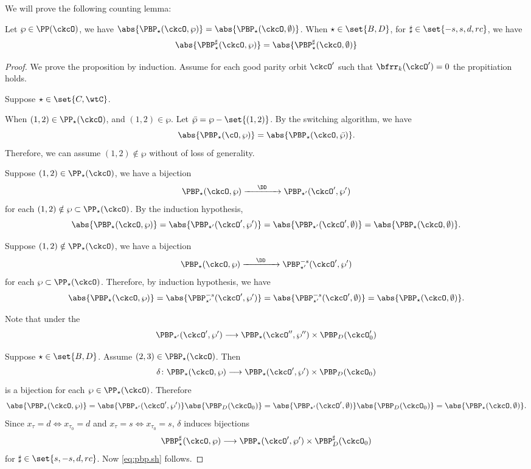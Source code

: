 \documentclass[unipcounting]{subfiles}
\begin{document}
We will prove the following counting lemma:

\begin{prop}
Let $\wp\in \PP(\ckcO)$, we have $\abs{\PBP_\star(\ckcO,\wp)} = \abs{\PBP_\star(\ckcO,\emptyset)}$. 
When $\star  \in \set{B,D}$, 
for $\sharp \in \set{ -s, s, d, rc}$,
we have  
\begin{equation}\label{eq:pbp.sh}
\abs{\PBP_\star^\sharp(\ckcO, \wp)}=\abs{\PBP_\star^\sharp(\ckcO, \emptyset)}
\end{equation}
\end{prop}
\begin{proof}
We prove the proposition by induction. 
Assume for each good parity orbit $\ckcO'$ such that $\bfrr_k(\ckcO')=0$ the propitiation holds.   

Suppose $\star\in \set{C,\wtC}$.

When $(1,2)\in \PP_\star(\ckcO)$, and $(1,2)\in \wp$.  
Let $\bar\wp = \wp  - \set{(1,2)}$.  
By the switching algorithm, we have 
\[
\abs{\PBP_\star(\cO,\wp)} = \abs{\PBP_\star(\ckcO,\bar\wp)}.
\]
Therefore, we can assume $(1,2)\notin \wp$ without of loss of generality. 

Suppose $(1,2)\in \PP_\star(\ckcO)$, we have a bijection
\[
\PBP_\star(\ckcO,\wp)\xrightarrow{\ \ \ \ \DD\ \ \ \ }\PBP_{\star'}(\ckcO',\wp')
\]
for each $(1,2)\notin \wp\subset \PP_\star(\ckcO)$. 
By the induction hypothesis, 
\[
\abs{\PBP_\star(\ckcO,\wp)} = \abs{\PBP_{\star'}(\ckcO',\wp')}
= \abs{\PBP_{\star'}(\ckcO',\emptyset)} = 
\abs{\PBP_\star(\ckcO,\emptyset)}.
\]

Suppose $(1,2)\notin \PP_\star(\ckcO)$, we have a bijection
\[
\PBP_\star(\ckcO,\wp)\xrightarrow{\ \ \ \ \DD\ \ \ \ } \PBP_{\star'}^{-s}(\ckcO',\wp')
\]
for each $\wp \subset \PP_\star(\ckcO)$. 
Therefore, by induction hypothesis, we have 
\[
\abs{\PBP_\star(\ckcO,\wp)} = \abs{\PBP_{\star'}^{-s}(\ckcO',\wp')}
= \abs{\PBP_{\star'}^{-s}(\ckcO',\emptyset)}
= \abs{\PBP_\star(\ckcO,\emptyset)}.
\]

Note that under the  
\[
\PBP_{\star'}(\ckcO',\wp')\longrightarrow \PBP_{\star}(\ckcO'', \wp'')\times 
\PBP_{D}(\ckcO'_0)
\]

Suppose $\star \in \set{B,D}$. 
Assume $(2,3)\in \PBP_\star(\ckcO)$. 
Then
\[
\delta \colon \PBP_{\star}(\ckcO,\wp)\longrightarrow \PBP_{\star}(\ckcO', \wp')\times \PBP_{D}(\ckcO_0)
\]
is a bijection for each $\wp \in \PP_\star(\ckcO)$. 
Therefore
\[
\abs{\PBP_\star(\ckcO,\wp)} =
\abs{\PBP_{\star'}(\ckcO',\wp')}\abs{\PBP_{D}(\ckcO_0)}
= \abs{\PBP_{\star'}(\ckcO',\emptyset)}\abs{\PBP_{D}(\ckcO_0)}
= \abs{\PBP_\star(\ckcO,\emptyset)}.
\]
Since 
$x_\tau = d\Leftrightarrow x_{\tau_0} =d$
and 
$x_\tau = s\Leftrightarrow x_{\tau_0} = s$, 
$\delta$ induces bijections 
\[
\PBP_{\star}^\sharp (\ckcO,\wp) \longrightarrow  \PBP_{\star}(\ckcO', \wp')\times
\PBP_{D}^\sharp(\ckcO_0)%
\]
for  $\sharp \in \set{s,-s,d,rc}$. 
Now \eqref{eq:pbp.sh} follows. 


\end{proof}
\end{document}
